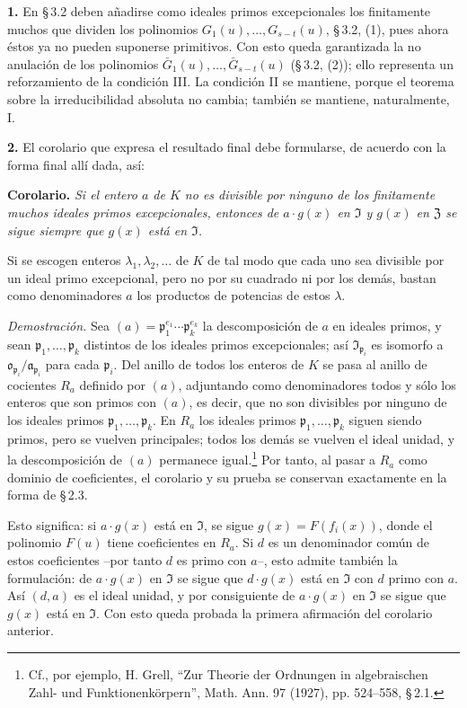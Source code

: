 \medskip\noindent\textbf{1.}
En \S\,3.2 deben añadirse como ideales primos excepcionales los finitamente muchos que dividen los polinomios $G_1(u),\ldots,G_{s-t}(u)$, \S\,3.2, (1), pues ahora éstos ya no pueden suponerse primitivos. Con esto queda garantizada la no anulación de los polinomios $\bar G_1(u),\ldots,\bar G_{s-t}(u)$ (\S\,3.2, (2)); ello representa un reforzamiento de la condición III. La condición II se mantiene, porque el teorema sobre la irreducibilidad absoluta no cambia; también se mantiene, naturalmente, I.

\medskip\noindent\textbf{2.}
El corolario que expresa el resultado final debe formularse, de acuerdo con la forma final allí dada, así:

\noindent\textbf{Corolario.}
\emph{Si el entero $a$ de $K$ no es divisible por ninguno de los finitamente muchos ideales primos excepcionales, entonces de $a\cdot g(x)$ en $\mathfrak{I}$ y $g(x)$ en $\mathfrak{Z}$ se sigue siempre que $g(x)$ está en $\mathfrak{I}$.}

Si se escogen enteros $\lambda_1,\lambda_2,\ldots$ de $K$ de tal modo que cada uno sea divisible por un ideal primo excepcional, pero no por su cuadrado ni por los demás, bastan como denominadores $a$ los productos de potencias de estos $\lambda$.

\noindent\emph{Demostración.}
Sea $(a)=\mathfrak{p}_1^{e_1}\cdots\mathfrak{p}_k^{e_k}$ la descomposición de $a$ en ideales primos, y sean $\mathfrak{p}_1,\ldots,\mathfrak{p}_k$ distintos de los ideales primos excepcionales; así $\mathfrak{I}_{\mathfrak{p}_i}$ es isomorfo a $\mathfrak{o}_{\mathfrak{p}_i}/\mathfrak{a}_{\mathfrak{p}_i}$ para cada $\mathfrak{p}_i$. Del anillo de todos los enteros de $K$ se pasa al anillo de cocientes $R_a$ definido por $(a)$, adjuntando como denominadores todos y sólo los enteros que son primos con $(a)$, es decir, que no son divisibles por ninguno de los ideales primos $\mathfrak{p}_1,\ldots,\mathfrak{p}_k$. En $R_a$ los ideales primos $\mathfrak{p}_1,\ldots,\mathfrak{p}_k$ siguen siendo primos, pero se vuelven principales; todos los demás se vuelven el ideal unidad, y la descomposición de $(a)$ permanece igual.\footnote{Cf., por ejemplo, H. Grell, ``Zur Theorie der Ordnungen in algebraischen Zahl- und Funktionenkörpern'', Math. Ann. 97 (1927), pp. 524--558, \S\,2.1.} Por tanto, al pasar a $R_a$ como dominio de coeficientes, el corolario y su prueba se conservan exactamente en la forma de \S\,2.3.

Esto significa: si $a\cdot g(x)$ está en $\mathfrak{I}$, se sigue $g(x)=F(f_i(x))$, donde el polinomio $F(u)$ tiene coeficientes en $R_a$. Si $d$ es un denominador común de estos coeficientes --por tanto $d$ es primo con $a$--, esto admite también la formulación: de $a\cdot g(x)$ en $\mathfrak{I}$ se sigue que $d\cdot g(x)$ está en $\mathfrak{I}$ con $d$ primo con $a$. Así $(d,a)$ es el ideal unidad, y por consiguiente de $a\cdot g(x)$ en $\mathfrak{I}$ se sigue que $g(x)$ está en $\mathfrak{I}$. Con esto queda probada la primera afirmación del corolario anterior.

